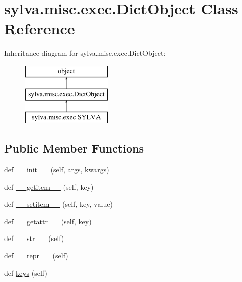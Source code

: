 \hypertarget{classsylva_1_1misc_1_1exec_1_1_dict_object}{}\section{sylva.\+misc.\+exec.\+Dict\+Object Class Reference}
\label{classsylva_1_1misc_1_1exec_1_1_dict_object}
Inheritance diagram for sylva.\+misc.\+exec.\+Dict\+Object\+:\begin{figure}[H]
\begin{center}
\leavevmode
\includegraphics[height=3.000000cm]{classsylva_1_1misc_1_1exec_1_1_dict_object}
\end{center}
\end{figure}
\subsection*{Public Member Functions}
\begin{DoxyCompactItemize}
\item 
def \hyperlink{classsylva_1_1misc_1_1exec_1_1_dict_object_acd7ac78ad80858775f4752edab3bb9f0}{\+\_\+\+\_\+init\+\_\+\+\_\+} (self, \hyperlink{namespacesylva_1_1misc_1_1exec_a4e70593929af3f6aa7fa94d0b4318766}{args}, kwargs)
\item 
def \hyperlink{classsylva_1_1misc_1_1exec_1_1_dict_object_ab360685e86a5d323b99adcde29546ebb}{\+\_\+\+\_\+getitem\+\_\+\+\_\+} (self, key)
\item 
def \hyperlink{classsylva_1_1misc_1_1exec_1_1_dict_object_a219a0c8ab7c1f0a05a76c5c79f86fe59}{\+\_\+\+\_\+setitem\+\_\+\+\_\+} (self, key, value)
\item 
def \hyperlink{classsylva_1_1misc_1_1exec_1_1_dict_object_a194306589e55ae82911d017462eb5f8e}{\+\_\+\+\_\+getattr\+\_\+\+\_\+} (self, key)
\item 
def \hyperlink{classsylva_1_1misc_1_1exec_1_1_dict_object_a7c974971714369cdba35b66479addd71}{\+\_\+\+\_\+str\+\_\+\+\_\+} (self)
\item 
def \hyperlink{classsylva_1_1misc_1_1exec_1_1_dict_object_a50fd48db155e090c3fb26a50e2999a95}{\+\_\+\+\_\+repr\+\_\+\+\_\+} (self)
\item 
def \hyperlink{classsylva_1_1misc_1_1exec_1_1_dict_object_a8a81846b980700e7552d76f4fa1eff1e}{keys} (self)
\end{DoxyCompactItemize}


